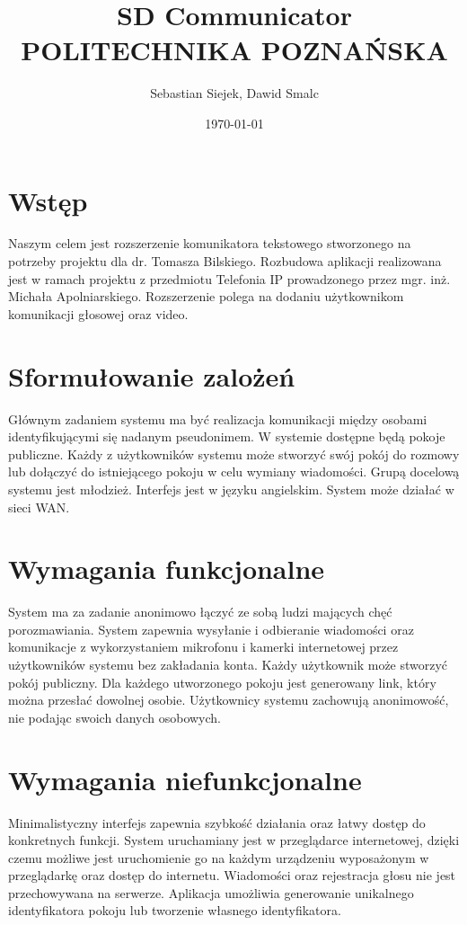 \documentclass{article}
\title{\textbf{SD Communicator} \\ POLITECHNIKA POZNAŃSKA}
\author{Sebastian Siejek, Dawid Smalc}
\date{\today}
\begin{document}
\maketitle

\tableofcontents{}

\section{Wstęp}

Naszym celem jest rozszerzenie komunikatora tekstowego stworzonego na potrzeby projektu dla dr. Tomasza Bilskiego. Rozbudowa aplikacji realizowana jest w ramach projektu z przedmiotu Telefonia IP prowadzonego przez mgr. inż. Michała Apolniarskiego. Rozszerzenie polega na dodaniu użytkownikom komunikacji głosowej oraz video.

\section{Sformułowanie zalożeń}

Głównym zadaniem systemu ma być realizacja komunikacji między osobami identyfikującymi się nadanym pseudonimem. W systemie dostępne będą pokoje publiczne. Każdy z użytkowników systemu może stworzyć swój pokój do rozmowy lub dołączyć do istniejącego pokoju w celu wymiany wiadomości. Grupą docelową systemu jest młodzież. Interfejs jest w języku angielskim. System może działać w sieci WAN.

\section{Wymagania funkcjonalne}

System ma za zadanie anonimowo łączyć ze sobą ludzi mających chęć porozmawiania. System zapewnia wysyłanie i odbieranie wiadomości oraz komunikacje z wykorzystaniem mikrofonu i kamerki internetowej przez użytkowników systemu bez zakładania konta. Każdy użytkownik może stworzyć pokój publiczny. Dla każdego utworzonego pokoju jest generowany link, który można przesłać dowolnej osobie. Użytkownicy systemu zachowują anonimowość, nie podając swoich danych osobowych.

\section{Wymagania niefunkcjonalne}

Minimalistyczny interfejs zapewnia szybkość działania oraz łatwy dostęp do konkretnych funkcji. System uruchamiany jest w przeglądarce internetowej, dzięki czemu możliwe jest uruchomienie go na każdym urządzeniu wyposażonym w przeglądarkę oraz dostęp do internetu. Wiadomości oraz rejestracja głosu nie jest przechowywana na serwerze. Aplikacja umożliwia generowanie unikalnego identyfikatora pokoju lub tworzenie własnego identyfikatora.
\end{document}
